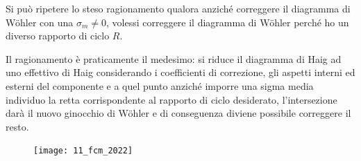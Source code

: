 			Si può ripetere lo steso ragionamento qualora anziché correggere il diagramma di Wöhler con una $\sigma_m\ne0$, volessi correggere il diagramma di Wöhler perché ho un diverso rapporto di ciclo $R$. 
			
			Il ragionamento è praticamente il medesimo: si riduce il diagramma di Haig ad uno effettivo di Haig considerando i coefficienti di correzione, gli aspetti interni ed esterni del componente e a quel punto anziché imporre una sigma media individuo la retta corrispondente al rapporto di ciclo desiderato, l'intersezione darà il nuovo ginocchio di Wöhler e di conseguenza diviene possibile correggere il resto.

		\begin{figure}[H]
		\texttt{[image: 11\_fcm\_2022]}
		\end{figure}
